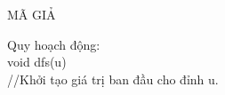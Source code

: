 \documentclass[10pt,a4paper]{article}
\begin{document}
\begin{center}
    \fontsize{30}{30}\selectfont
    MÃ GIẢ \\
\end{center}

\fontsize{14}{20}\selectfont
Quy hoạch động:\\
void dfs(u)\\
\hspace{5cm} //Khởi tạo giá trị ban đầu cho đỉnh u.\\

    
\end{document}
